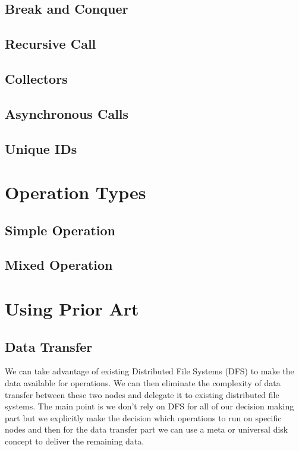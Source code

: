 \subsection{Break and Conquer}
\subsection{Recursive Call}
\subsection{Collectors}
\subsection{Asynchronous Calls}
\subsection{Unique IDs}


\section{Operation Types}
\subsection{Simple Operation}
\subsection{Mixed Operation}

\section{Using Prior Art}
\subsection{Data Transfer}
We can take advantage of existing Distributed File Systems
(DFS) to make the data available for operations. We can then eliminate
the complexity of data transfer between these two nodes and delegate it
to existing distributed file systems. The main point is we don't rely on
DFS for all of our decision making part but we explicitly make the 
decision which operations to run on specific nodes and then for the 
data transfer part we can use a meta or universal disk concept to deliver the
remaining data.
